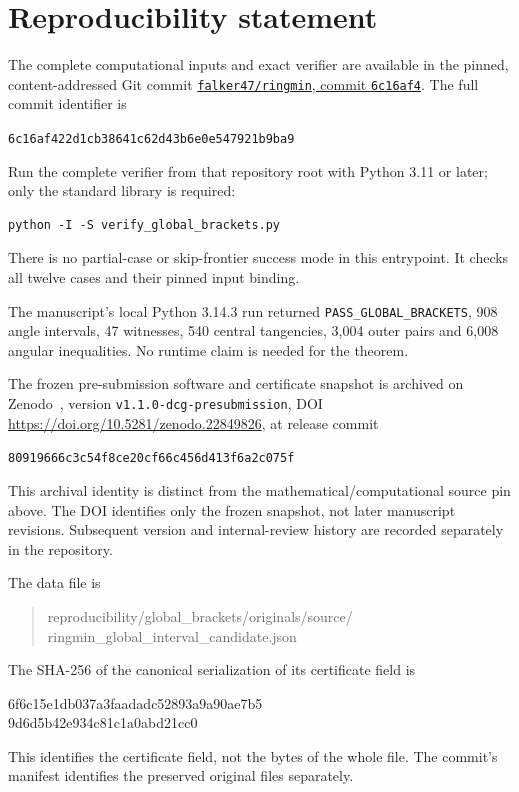 \documentclass[11pt]{article}
\theoremstyle{definition}
\theoremstyle{remark}
\newcommand{\snapshot}{6c16af422d1cb38641c62d43b6e0e547921b9ba9}
\begin{document}
\section{Reproducibility statement}\label{sec:repro}
The complete computational inputs and exact verifier are available in the
pinned, content-addressed Git commit
\href{https://github.com/falker47/ringmin/tree/6c16af422d1cb38641c62d43b6e0e547921b9ba9}{\texttt{falker47/ringmin}, commit \texttt{6c16af4}}.
The full commit identifier is
\begin{center}\small\texttt{\snapshot}\end{center}
Run the complete verifier from that repository root with Python 3.11 or
later; only the standard library is required:
\begin{verbatim}
python -I -S verify_global_brackets.py
\end{verbatim}
There is no partial-case or skip-frontier success mode in this entrypoint.
It checks all twelve cases and their pinned input binding.

The manuscript's local Python 3.14.3 run returned
\texttt{PASS\_GLOBAL\_BRACKETS}, 908 angle intervals, 47 witnesses,
540 central tangencies, 3,004 outer pairs and 6,008 angular inequalities.
No runtime claim is needed for the theorem.

The frozen pre-submission software and certificate snapshot is archived on
Zenodo~\cite{ringmin-archive}, version \texttt{v1.1.0-dcg-presubmission},
DOI \url{https://doi.org/10.5281/zenodo.22849826}, at release commit
\begin{center}\small\texttt{80919666c3c54f8ce20cf66c456d413f6a2c075f}\end{center}
This archival identity is distinct from the mathematical/computational
source pin above. The DOI identifies only the frozen snapshot, not later
manuscript revisions. Subsequent version and internal-review history are
recorded separately in the repository.

The data file is
\begin{quote}\small\ttfamily\raggedright
reproducibility/global\_brackets/originals/source/\allowbreak
ringmin\_global\_interval\_candidate.json
\end{quote}
The SHA-256 of the canonical serialization of its certificate field is
\begin{center}\small\ttfamily
6f6c15e1db037a3faadadc52893a9a90ae7b5\\
9d6d5b42e934c81c1a0abd21cc0
\end{center}
This identifies the certificate field, not the bytes of the whole file.
The commit's manifest identifies the preserved original files separately.
\end{document}
